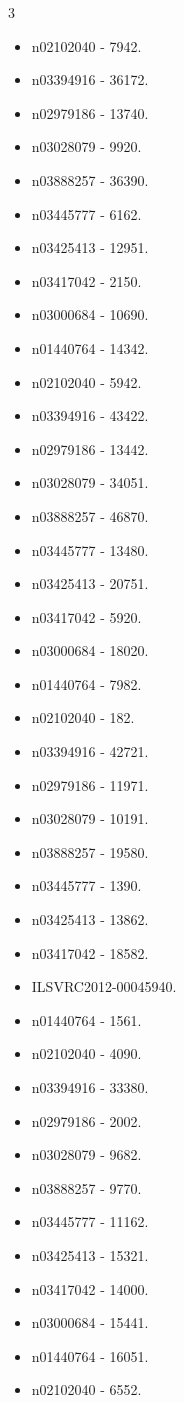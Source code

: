 \begin{multicols}{3}
\begin{itemize}
\item n02102040 - 7942.
\item n03394916 - 36172.
\item n02979186 - 13740.
\item n03028079 - 9920.
\item n03888257 - 36390.
\item n03445777 - 6162.
\item n03425413 - 12951.
\item n03417042 - 2150.
\item n03000684 - 10690.
\item n01440764 - 14342.
\item n02102040 - 5942.
\item n03394916 - 43422.
\item n02979186 - 13442.
\item n03028079 - 34051.
\item n03888257 - 46870.
\item n03445777 - 13480.
\item n03425413 - 20751.
\item n03417042 - 5920.
\item n03000684 - 18020.
\item n01440764 - 7982.
\item n02102040 - 182.
\item n03394916 - 42721.
\item n02979186 - 11971.
\item n03028079 - 10191.
\item n03888257 - 19580.
\item n03445777 - 1390.
\item n03425413 - 13862.
\item n03417042 - 18582.
\item ILSVRC2012-00045940.
\item n01440764 - 1561.
\item n02102040 - 4090.
\item n03394916 - 33380.
\item n02979186 - 2002.
\item n03028079 - 9682.
\item n03888257 - 9770.
\item n03445777 - 11162.
\item n03425413 - 15321.
\item n03417042 - 14000.
\item n03000684 - 15441.
\item n01440764 - 16051.
\item n02102040 - 6552.

\end{itemize}
\end{multicols}

